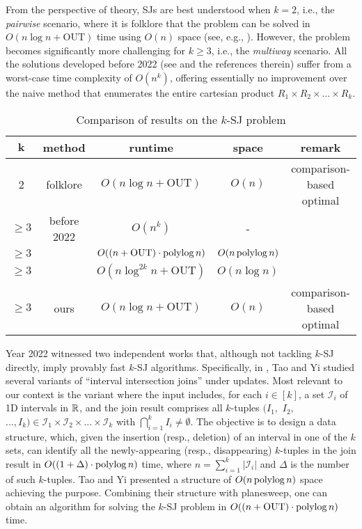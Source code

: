 \documentclass[sigconf]{acmart}
\def\vgap{\vspace{0mm}}
\def\I{\mathcal{I}}
\def\out{\mathrm{OUT}}
\begin{document}
From the perspective of theory, SJs are best understood when $k = 2$, i.e., the {\em pairwise} scenario, where it is folklore that the problem can be solved in $O(n \log n + \out)$ time using $O(n)$ space (see, e.g., \cite{bcko08}). However, the problem becomes significantly more challenging for $k \ge 3$, i.e., the {\em multiway} scenario. All the solutions developed  before 2022 (see \cite{gcn+13,mp98,mp01,pmt99} and the references therein) suffer from a worst-case time complexity of $O(n^k)$, offering essentially no improvement over the naive method that enumerates the entire cartesian product $R_1 \times R_2 \times ... \times R_k$.


\begin{table*} 
    \begin{tabular}{c|c|c|c|c} 
        $\bm{k}$ & {\bf method} & {\bf runtime} & {\bf space} & {\bf remark} \\
        \hline\hline 
        2 & folklore & $O(n \log n + \out)$ & $O(n)$ & comparison-based optimal \\ 
        \hline
        $\ge 3$ & before 2022 & $O(n^k)$ & - & \\ 
        $\ge 3$ & \cite{ty22} & $O((n + \out) \cdot \polylog n)$ & $O(n \operatorname*{polylog} n)$ & \\ 
        $\ge 3$ & \cite{kcko22} & $O(n \log^{2k} n + \out)$ & $O(n \log n)$ & \\ 
        \hline
        $\ge 3$ & ours & $O(n \log n + \out)$ & $O(n)$ & comparison-based optimal
    \end{tabular}
    
    \vspace{3mm}
    \caption{Comparison of results on the $k$-SJ problem} 
    \label{tab:results-com}
\end{table*}

\vgap

Year 2022 witnessed two independent works \cite{ty22,kcko22} that, although not tackling $k$-SJ directly, imply provably fast $k$-SJ algorithms. Specifically, in \cite{ty22}, Tao and Yi studied several variants of ``interval intersection joins'' under updates. Most relevant to our context is the variant where the input includes, for each $i \in [k]$, a set $\I_i$ of 1D intervals in $\mathbb{R}$, and the join result comprises all $k$-tuples $(I_1,$ $I_2,$ $..., I_k) \in \I_1 \times \I_2 \times ... \times \I_k$ with $\bigcap_{i=1}^k I_i \neq \emptyset$. The objective is to design a data structure, which, given the insertion (resp., deletion) of an interval in one of the $k$ sets, can identify all the newly-appearing (resp., disappearing) $k$-tuples in the join result in $O((1+\Delta) \cdot \operatorname*{polylog} n)$ time, where $n = \sum_{i=1}^k |\I_i|$ and $\Delta$ is the number of such $k$-tuples. Tao and Yi \cite{ty22} presented a structure of $O(n \operatorname*{polylog} n)$ space achieving the purpose. Combining their structure with planesweep, one can obtain an algorithm for solving the $k$-SJ problem in $O((n + \out) \cdot \polylog n)$ time.
\end{document}
